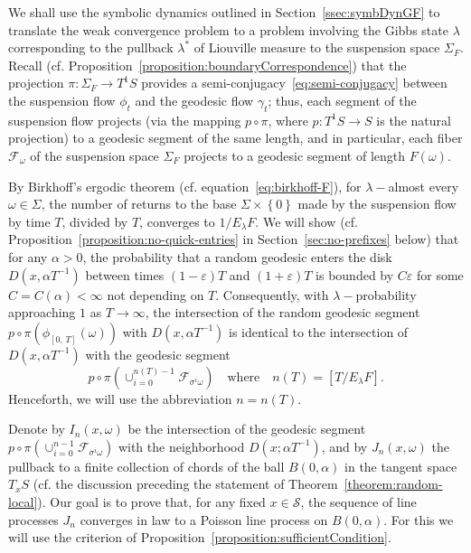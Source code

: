 \documentclass[AHL, Unicode, longabstracts, published]{cedram}
\newcommand{\xset}[1]{\left\{ #1 \right\}}
\begin{document}
We shall use the symbolic dynamics outlined in Section~\ref{ssec:symbDynGF} to translate the weak convergence problem to a problem involving the Gibbs state $\lambda$ corresponding to the pullback $\lambda^{*}$ of Liouville measure to the suspension space $\Sigma_{F}$. Recall (cf. Proposition~\ref{proposition:boundaryCorrespondence}) that the projection $\pi:\Sigma_{F}\rightarrow T^{1}S$ provides a semi-conjugacy~\eqref{eq:semi-conjugacy} between the suspension flow $\phi_{t}$ and the geodesic flow $\gamma_{t}$; thus, each segment of the suspension flow projects (via the mapping $p\circ\pi$, where $p:T^{1}S\rightarrow S$ is the natural projection) to a geodesic segment of the same length, and in particular, each fiber $\mathcal{F}_{\omega}$ of the suspension space $\Sigma_{F}$ projects to a geodesic segment of length $F(\omega)$.


By Birkhoff's ergodic theorem (cf. equation~\eqref{eq:birkhoff-F}), for $\lambda-$almost every $\omega \in
\Sigma$, the number of returns to the base $\Sigma \times \xset {0}$ made by the suspension flow by time $T$, divided by $T$, converges to $1/E_{\lambda}F $. We will show (cf. Proposition~\ref{proposition:no-quick-entries} in Section~\ref{sec:no-prefixes} below) that for any $\alpha>0$, the probability that a random geodesic enters the disk $D(x,\alpha T^{-1})$ between times $(1- \varepsilon)T$ and $(1+ \varepsilon)T$ is bounded by $C\varepsilon$ for some $C=C(\alpha)<\infty$ not depending on $T$. Consequently, with $\lambda-$probability approaching $1$ as $T\rightarrow\infty$, the intersection of the random geodesic segment $p \circ \pi (\phi_{[0,\,T]}(\omega))$ with $D(x, \alpha T^{-1})$ is identical to the intersection of $D(x, \alpha T^{-1})$ with the geodesic segment
\begin{equation}\label{eq:n}
p\circ\pi(\cup _{i=0}^{n(T)-1}\mathcal{F}_{\sigma^{i}\omega}) \quad\text{where} \quad n (T)= [T/E_{\lambda}F].
\end{equation}
Henceforth, we will use the abbreviation $n=n(T)$.

Denote by $I_{n} (x,\omega)$ be the intersection of the geodesic segment $p\circ\pi(\cup _{i=0}^{n-1}\mathcal{F}_{\sigma^{i}\omega})$ with the neighborhood $D(x;\alpha T^{-1})$, and by $J_{n}(x, \omega)$ the pullback to a finite collection of chords of the ball $B(0, \alpha)$ in the tangent space $T_{x}S$ (cf. the discussion preceding the statement of Theorem~\ref{theorem:random-local}). Our goal is to prove that, for any fixed $x\in \mathcal{S}$, the sequence of line processes $J_{n}$ converges in law to a Poisson line process on $B (0,\alpha)$. For this we will use the criterion of Proposition~\ref{proposition:sufficientCondition}.
\end{document}

